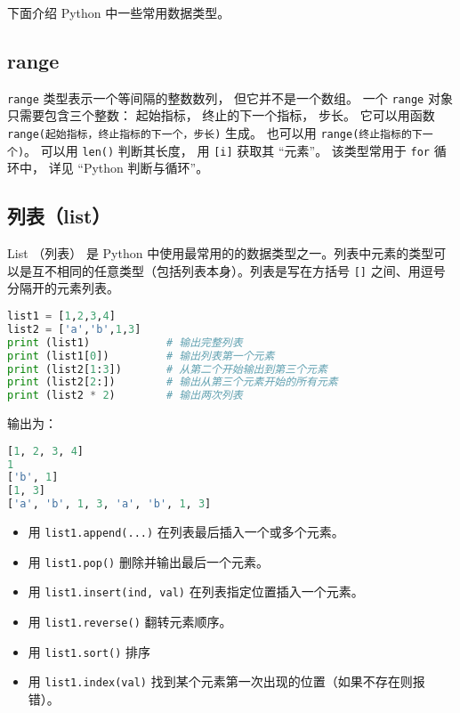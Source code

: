 

下面介绍 Python 中一些常用数据类型。 

\subsection{range}
\verb|range| 类型表示一个等间隔的整数数列， 但它并不是一个数组。 一个 \verb|range| 对象只需要包含三个整数： 起始指标， 终止的下一个指标， 步长。 它可以用函数 \verb|range(起始指标，终止指标的下一个，步长)| 生成。 也可以用 \verb|range(终止指标的下一个)|。 可以用 \verb|len()| 判断其长度， 用 \verb|[i]| 获取其 “元素”。 该类型常用于 \verb|for| 循环中， 详见 “Python 判断与循环”。

\subsection{列表（list）}
List （列表） 是 Python 中使用最常用的的数据类型之一。列表中元素的类型可以是互不相同的任意类型（包括列表本身）。列表是写在方括号 \verb|[]| 之间、用逗号分隔开的元素列表。
\begin{lstlisting}[language=python]
list1 = [1,2,3,4]
list2 = ['a','b',1,3]
print (list1)            # 输出完整列表
print (list1[0])         # 输出列表第一个元素
print (list2[1:3])       # 从第二个开始输出到第三个元素
print (list2[2:])        # 输出从第三个元素开始的所有元素
print (list2 * 2)        # 输出两次列表
\end{lstlisting}
输出为：
\begin{lstlisting}[language=python]
[1, 2, 3, 4]
1
['b', 1]
[1, 3]
['a', 'b', 1, 3, 'a', 'b', 1, 3]
\end{lstlisting}
\begin{itemize}
\item 用 \verb|list1.append(...)| 在列表最后插入一个或多个元素。
\item 用 \verb|list1.pop()| 删除并输出最后一个元素。
\item 用 \verb|list1.insert(ind, val)| 在列表指定位置插入一个元素。
\item 用 \verb|list1.reverse()| 翻转元素顺序。
\item 用 \verb|list1.sort()| 排序
\item 用 \verb|list1.index(val)| 找到某个元素第一次出现的位置（如果不存在则报错）。
\end{itemize}


